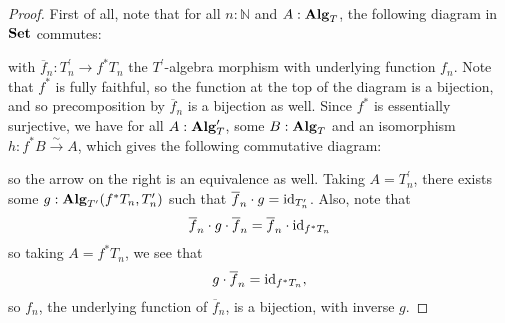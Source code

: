\begin{proof}
  First of all, note that for all $ n : \mathbb N $ and $ A : \mathbf{Alg}_{T} $, the following diagram in $ \mathbf{Set} $ commutes:
  \begin{center}
  \end{center}
  with $ \overline f_n: T^\prime_n \to f^* T_n $ the $ T^\prime $-algebra morphism with underlying function $ f_n $. Note that $ f^* $ is fully faithful, so the function at the top of the diagram is a bijection, and so precomposition by $ \overline f_n $ is a bijection as well. Since $ f^* $ is essentially surjective, we have for all $ A : \mathbf{Alg}_{T}^\prime $, some $ B : \mathbf{Alg}_{T} $ and an isomorphism $ h: f^* B \xrightarrow \sim A $, which gives the following commutative diagram:
  \begin{center}
  \end{center}
  so the arrow on the right is an equivalence as well. Taking $ A = T^\prime_n $, there exists some $ g: \mathbf{Alg}_{T^\prime}(f^* T_n, T^\prime_n) $ such that $ \overline f_n \cdot g = \text{id}_{T^\prime_n} $. Also, note that
  \[ \overline f_n \cdot g \cdot \overline f_n = \overline f_n \cdot \text{id}_{f^* T_n} \]
  so taking $ A = f^* T_n $, we see that
  \[ g \cdot \overline f_n = \text{id}_{f^* T_n}, \]
  so $ f_n $, the underlying function of $ \overline f_n $, is a bijection, with inverse $ g $.
\end{proof}

